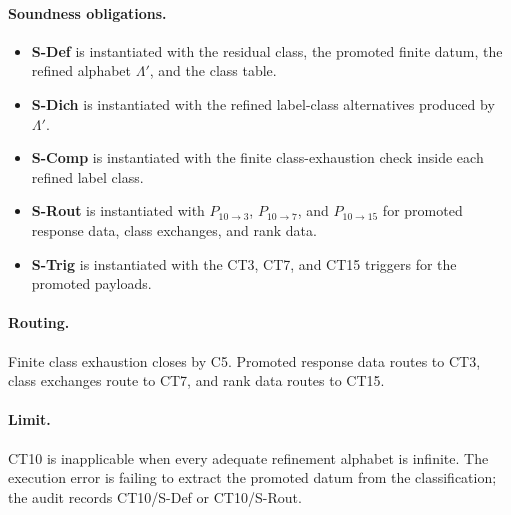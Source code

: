 \documentclass[
  11pt,
]{article}
\providecommand{\tightlist}{%
  \setlength{\itemsep}{0pt}\setlength{\parskip}{0pt}}
\theoremstyle{definition}
\newcommand{\ctpar}[1]{\paragraph{#1.}}
\begin{document}
\ctpar{Soundness obligations}
\begin{itemize}
\tightlist
\item \textbf{S-Def} is instantiated with the residual class, the promoted finite datum, the refined alphabet \(\Lambda'\), and the class table.
\item \textbf{S-Dich} is instantiated with the refined label-class alternatives produced by \(\Lambda'\).
\item \textbf{S-Comp} is instantiated with the finite class-exhaustion check inside each refined label class.
\item \textbf{S-Rout} is instantiated with \(P_{10\to3}\), \(P_{10\to7}\), and \(P_{10\to15}\) for promoted response data, class exchanges, and rank data.
\item \textbf{S-Trig} is instantiated with the CT3, CT7, and CT15 triggers for the promoted payloads.
\end{itemize}

\ctpar{Routing}
Finite class exhaustion closes by C5.  Promoted response data routes to
CT3, class exchanges route to CT7, and rank data routes to CT15.

\ctpar{Limit}
CT10 is inapplicable when every adequate refinement alphabet is infinite. The execution
error is failing to extract the promoted datum from the classification;
the audit records CT10/S-Def or CT10/S-Rout.
\end{document}
